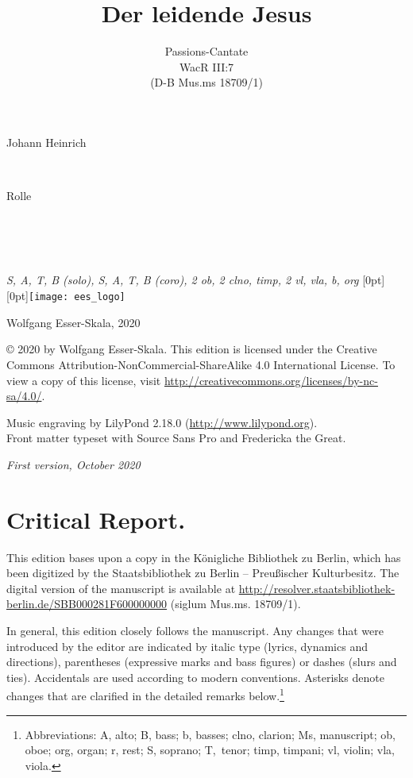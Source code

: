 \documentclass[parskip=full]{scrreprt}
\makeatletter
\DeclareRobustCommand{\sbseries}{\fontseries{sb}\selectfont}
\newcommand\fancytitlehead{
	\headingfont%
	\fontsize{80}{80}\selectfont\textcolor{black!80}{\@ifundefined{@shortname}{\@lastname}{\@shortname}.}\\[15pt]%
	\fontsize{50}{50}\selectfont\@ifundefined{@shorttitle}{\@title}{\@shorttitle}.%
}
\def\firstname#1{\def\@firstname{#1}}
\def\lastname#1{\def\@lastname{#1}}
\def\instrumentation#1{\def\@instrumentation{#1}}
\def\maketitle{%
\begin{titlepage}%
	\Large%
	{\@titlehead}%
	\vfill%
	{\strut\@firstname}\\%
	{\sbseries\color{oldred}\strut\@lastname}\\%
	{\strut\@namesuffix}%
	\vfill%
	{\sbseries\@title}\\%
	{\@subtitle}\\[\baselineskip]%
	{\itshape\@instrumentation}%
	\vfill%
	{\itshape\@parts}\hspace*{\fill}\raisebox{0pt}[0pt][0pt]{\texttt{[image: ees\_logo]}}%
\end{titlepage}%
}
\newif\ifprintreport\printreportfalse
\makeatother
\begin{document}
\frenchspacing

\titlehead{\fancytitlehead}
\firstname{Johann Heinrich}
\lastname{Rolle}
\title{Der leidende Jesus}
\subtitle{Passions-Cantate\\WacR III:7\\(D-B Mus.ms 18709/1)}
\instrumentation{S, A, T, B (solo), S, A, T, B (coro), 2 ob, 2 clno, timp, 2 vl, vla, b, org}
\maketitle


\thispagestyle{empty}

\vspace*{\fill}

\hspace*{1em}Wolfgang Esser-Skala, 2020

© 2020 by Wolfgang Esser-Skala. This edition is licensed under the Creative Commons Attribution-NonCommercial-ShareAlike 4.0 International License. To view a copy of this license, visit \url{http://creativecommons.org/licenses/by-nc-sa/4.0/}.

Music engraving by LilyPond 2.18.0 (\url{http://www.lilypond.org}).\\
Front matter typeset with Source Sans Pro and Fredericka the Great.

\textit{First version, October 2020}

\vspace*{2cm}

\ifprintreport
\chapter*{Critical Report.}

This edition bases upon a copy in the Königliche Bibliothek zu Berlin, which has been digitized by the Staatsbibliothek zu Berlin – Preußischer Kulturbesitz. The digital version of the manuscript is available at \url{http://resolver.staatsbibliothek-berlin.de/SBB000281F600000000} (siglum Mus.ms. 18709/1).

In general, this edition closely follows the manuscript. Any changes that were introduced by the editor are indicated by italic type (lyrics, dynamics and directions), parentheses (expressive marks and bass figures) or dashes (slurs and ties). Accidentals are used according to modern conventions. Asterisks denote changes that are clarified in the detailed remarks below.\footnote{Abbreviations: A, alto; B, bass; b, basses; clno, clarion; Ms, manuscript; ob, oboe; org, organ; r, rest; S, soprano; T,~tenor; timp, timpani; vl, violin; vla, viola.}
\end{document}
